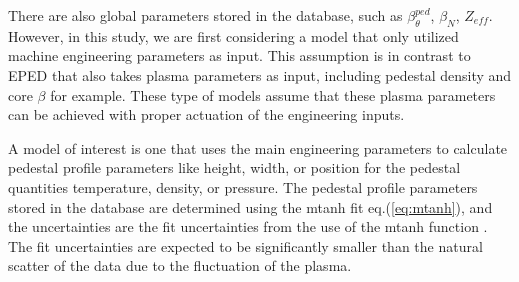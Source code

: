 \documentclass[a4paper, twoside, final, 12pt]{article}
\begin{document}
There are also global parameters stored in the database, such as $\beta_\theta^{ped}$, $\beta_N$, $Z_{eff}$. However, in this study, we are first considering a model that only utilized machine engineering parameters as input. This assumption is in contrast to EPED that also takes plasma parameters as input, including pedestal density and core  $\beta$ for example. These type of models assume that these plasma parameters can be achieved with proper actuation of the engineering inputs. 

A model of interest is one that uses the main engineering parameters to calculate pedestal profile parameters like height, width, or position for the pedestal quantities temperature, density, or pressure.
The pedestal profile parameters stored in the database are determined using the mtanh fit eq.\;(\ref{eq:mtanh}), and the uncertainties are the fit uncertainties from the use of the mtanh function \cite{Frassinetti_2020}.
The fit uncertainties are expected to be significantly smaller than the natural scatter of the data due to the fluctuation of the plasma.
\end{document}
